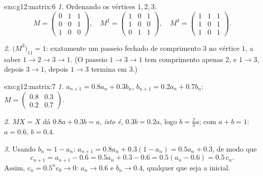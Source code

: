\begin{solution}{exo:g12:matrix:6}
\emph{1.} Ordenando os vértices $1, 2, 3$:
\[
M = \begin{pmatrix} 0&1&1\\ 0&0&1\\ 1&0&0\end{pmatrix}, \quad
M^2 = \begin{pmatrix} 1&0&1\\ 1&0&0\\ 0&1&1\end{pmatrix}, \quad
M^3 = \begin{pmatrix} 1&1&1\\ 1&0&1\\ 1&0&1 \end{pmatrix}.
\]

\emph{2.} $\bigl(M^3\bigr)_{11} = 1$: exatamente um passeio fechado de
comprimento $3$ no vértice $1$, a saber $1 \to 2 \to 3 \to 1$. (O passeio
$1 \to 3 \to 1$ tem comprimento apenas $2$, e $1 \to 3$, depois
$3\to1$, depois $1\to3$ termina em $3$.)
\end{solution}

\begin{solution}{exo:g12:matrix:7}
\emph{1.} $a_{n+1} = 0.8a_n + 0.3b_n$, $b_{n+1} = 0.2a_n + 0.7b_n$:
$M = \begin{pmatrix} 0.8 & 0.3\\ 0.2 & 0.7\end{pmatrix}$.

\emph{2.} $MX = X$ dá $0.8a + 0.3b = a$, \emph{isto é}, $0.3b = 0.2a$,
logo $b = \frac23 a$; com $a + b = 1$: $a = 0.6$, $b = 0.4$.

\emph{3.} Usando $b_n = 1 - a_n$:
$a_{n+1} = 0.8a_n + 0.3(1 - a_n) = 0.5a_n + 0.3$, de modo que
\[
c_{n+1} = a_{n+1} - 0.6 = 0.5a_n + 0.3 - 0.6 = 0.5(a_n - 0.6) = 0.5\,c_n .
\]
Assim, $c_n = 0.5^n c_0 \to 0$: $a_n \to 0.6$ e $b_n \to 0.4$, qualquer
que seja a  inicial.
\end{solution}

